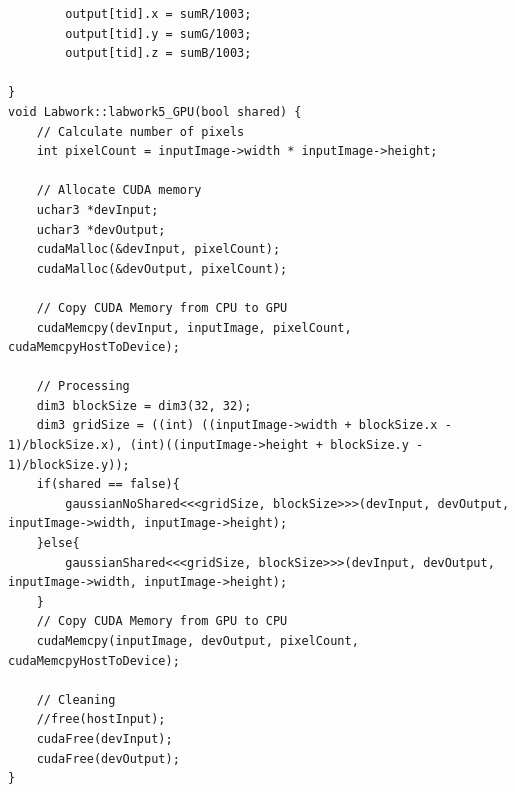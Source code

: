 \documentclass{article}
\begin{document}
\begin{lstlisting}
        output[tid].x = sumR/1003;
        output[tid].y = sumG/1003;
        output[tid].z = sumB/1003;

}
void Labwork::labwork5_GPU(bool shared) {
    // Calculate number of pixels
    int pixelCount = inputImage->width * inputImage->height;	

    // Allocate CUDA memory    
    uchar3 *devInput;
    uchar3 *devOutput;
    cudaMalloc(&devInput, pixelCount);
    cudaMalloc(&devOutput, pixelCount);
    
    // Copy CUDA Memory from CPU to GPU
    cudaMemcpy(devInput, inputImage, pixelCount, cudaMemcpyHostToDevice);

    // Processing
    dim3 blockSize = dim3(32, 32);
    dim3 gridSize = ((int) ((inputImage->width + blockSize.x - 1)/blockSize.x), (int)((inputImage->height + blockSize.y - 1)/blockSize.y));
    if(shared == false){
        gaussianNoShared<<<gridSize, blockSize>>>(devInput, devOutput, inputImage->width, inputImage->height);
    }else{
        gaussianShared<<<gridSize, blockSize>>>(devInput, devOutput, inputImage->width, inputImage->height);
    }
    // Copy CUDA Memory from GPU to CPU
    cudaMemcpy(inputImage, devOutput, pixelCount, cudaMemcpyHostToDevice);

    // Cleaning
    //free(hostInput);
    cudaFree(devInput);
    cudaFree(devOutput);
}

\end{lstlisting}
\newpage
\end{document}

